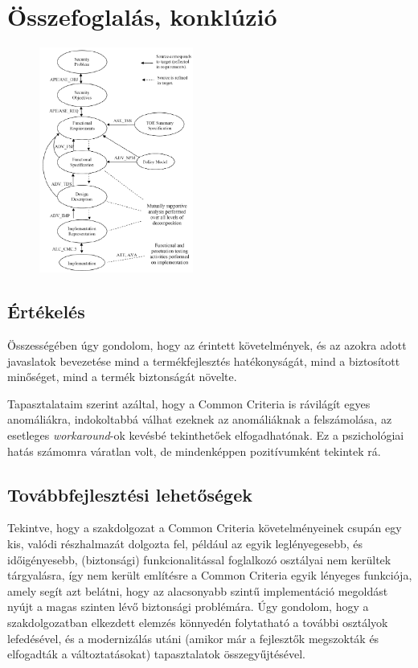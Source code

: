 \chapter{Összefoglalás, konklúzió}

\begin{figure}
    \includegraphics[width=0.45\textwidth, keepaspectratio]{figures/layers.png}
\end{figure}
\section{Értékelés}

Összességében úgy gondolom, hogy az érintett követelmények, és az azokra adott javaslatok bevezetése
mind a termékfejlesztés hatékonyságát, mind a biztosított minőséget, mind a termék biztonságát
növelte.


Tapasztalataim szerint azáltal, hogy a Common Criteria is rávilágít egyes anomáliákra, indokoltabbá
válhat ezeknek az anomáliáknak a felszámolása, az esetleges \emph{workaround}-ok kevésbé
tekinthetőek elfogadhatónak. Ez a pszichológiai hatás számomra váratlan volt, de mindenképpen
pozitívumként tekintek rá.

\section{Továbbfejlesztési lehetőségek}
Tekintve, hogy a szakdolgozat a Common Criteria követelményeinek csupán egy kis, valódi részhalmazát
dolgozta fel, például az egyik leglényegesebb, és időigényesebb, (biztonsági) funkcionalitással
foglalkozó osztályai nem kerültek tárgyalásra, így nem került említésre a Common Criteria egyik
lényeges funkciója, amely segít azt belátni, hogy az alacsonyabb szintű implementáció megoldást
nyújt a magas szinten lévő biztonsági problémára.
Úgy gondolom, hogy a szakdolgozatban elkezdett elemzés könnyedén folytatható a további osztályok
lefedésével, és a modernizálás utáni (amikor már a fejlesztők megszokták és elfogadták
a változtatásokat) tapasztalatok összegyűjtésével.
